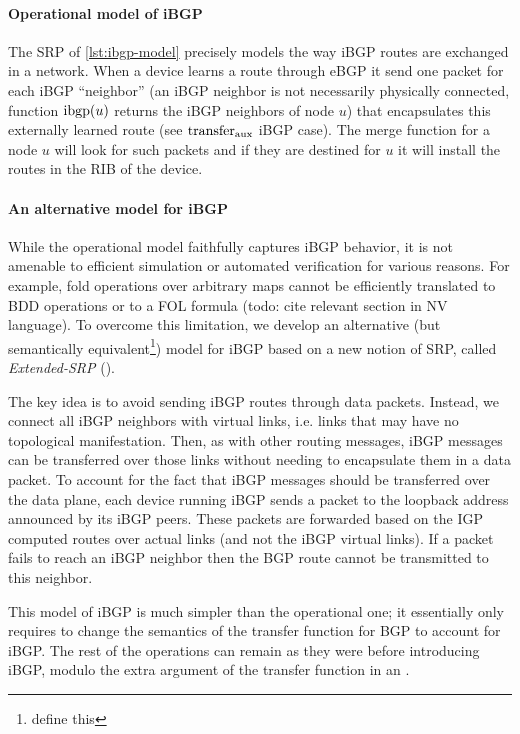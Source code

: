 \documentclass[sigconf,10pt]{acmart}
\begin{document}
\paragraph{Operational model of iBGP}
The SRP of \ref{lst:ibgp-model} precisely models the way iBGP
routes are exchanged in a network. When a device learns a route
through eBGP it send one packet for each iBGP ``neighbor'' (an iBGP
neighbor is not necessarily physically connected, function $\mathrm{ibgp}(u)$
returns the iBGP neighbors of node $u$) that encapsulates this
externally learned route (see $\mathrm{transfer}_{\mathrm{aux}}$ iBGP case). The merge
function for a node $u$ will look for such packets and if they are
destined for $u$ it will install the routes in the RIB of the device.

\paragraph{An alternative model for iBGP}

While the operational model faithfully captures iBGP behavior, it is
not amenable to efficient simulation or automated verification for
various reasons. For example, fold operations over arbitrary maps
cannot be efficiently translated to BDD operations or to a FOL formula
(todo: cite relevant section in NV language). To overcome this
limitation, we develop an alternative (but semantically
equivalent\footnote{define this}) model for iBGP based on a new notion
of SRP, called \emph{Extended-SRP} (\ESRP).

The key idea is to avoid sending iBGP routes through data packets.
Instead, we connect all iBGP neighbors with virtual links, i.e. links
that may have no topological manifestation. Then, as with other
routing messages, iBGP messages can be transferred over those links
without needing to encapsulate them in a data packet. To account for
the fact that iBGP messages should be transferred over the data plane,
each device running iBGP sends a packet to the loopback address
announced by its iBGP peers. These packets are forwarded based on the
IGP computed routes over actual links (and not the iBGP virtual
links). If a packet fails to reach an iBGP neighbor then the BGP
route cannot be transmitted to this neighbor.

This model of iBGP is much simpler than the operational one; it
essentially only requires to change the semantics of the transfer
function for BGP to account for iBGP. The rest of the operations can
remain as they were before introducing iBGP, modulo the extra argument
of the transfer function in an \ESRP.
\end{document}
